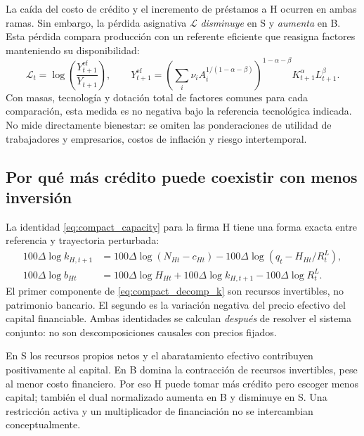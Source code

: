 La caída del costo de crédito y el incremento de préstamos a H
ocurren en ambas ramas. Sin embargo, la pérdida asignativa
\(\mathscr L\) \emph{disminuye} en S y \emph{aumenta} en B.
Esta pérdida compara producción con un referente eficiente
que reasigna factores manteniendo su disponibilidad:
\begin{equation}\label{eq:compact_loss}
\mathscr L_t=
\log\left(\frac{Y^{\mathrm{ef}}_{t+1}}{Y_{t+1}}\right),
\qquad
Y^{\mathrm{ef}}_{t+1}=
\left(\sum_i\nu_i A_i^{1/(1-\alpha-\beta)}\right)^{
1-\alpha-\beta}
 K_{t+1}^{\alpha}L_{t+1}^{\beta}.
\end{equation}
Con masas, tecnología y dotación total de factores comunes
para cada comparación, esta medida es no negativa bajo la
referencia tecnológica indicada. No mide directamente bienestar:
se omiten las ponderaciones de utilidad de trabajadores y
empresarios, costos de inflación y riesgo intertemporal.

\subsection{Por qué más crédito puede coexistir con menos inversión}
La identidad \eqref{eq:compact_capacity} para la firma H
tiene una forma exacta entre referencia y trayectoria perturbada:
\begin{align}
100\Delta\log k_{H,t+1}&=
100\Delta\log(N_{Ht}-c_{Ht})
-100\Delta\log(q_t-H_{Ht}/R_t^L),
\label{eq:compact_decomp_k}\\
100\Delta\log b_{Ht}&=
100\Delta\log H_{Ht}+
100\Delta\log k_{H,t+1}-
100\Delta\log R_t^L.
\label{eq:compact_decomp_b}
\end{align}
El primer componente de \eqref{eq:compact_decomp_k} son recursos
invertibles, no patrimonio bancario. El segundo es la variación
negativa del precio efectivo del capital financiable. Ambas
identidades se calculan \emph{después} de resolver el sistema
conjunto: no son descomposiciones causales con precios fijados.

\begin{table}[htbp]\centering\small
\caption{Componentes exactos del mecanismo empresarial H,
solución reducida no lineal finita de horizonte \(T=640\).
Contribuciones de logaritmos escaladas por 100 y dual normalizado
escalado por \(10^6\).}
\label{tab:compact_mechanism}

\end{table}

En S los recursos propios netos y el abaratamiento efectivo
contribuyen positivamente al capital. En B domina la contracción
de recursos invertibles, pese al menor costo financiero. Por eso
H puede tomar más crédito pero escoger menos capital; también
el dual normalizado aumenta en B y disminuye en S. Una restricción
activa y un multiplicador de financiación no se intercambian
conceptualmente.


